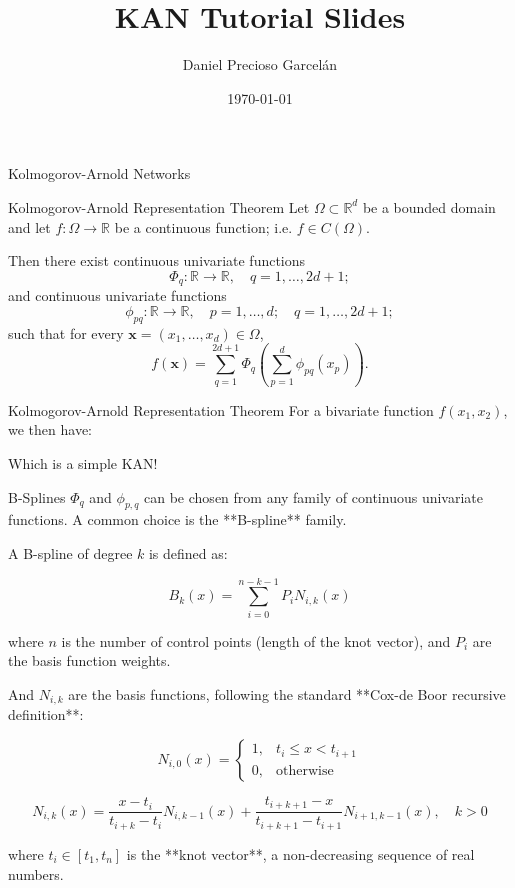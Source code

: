 \documentclass[aspectratio=169]{beamer}
\title{KAN Tutorial Slides}
\author{Daniel Precioso Garcelán}
\date{\today}
\begin{document}
\maketitle
\begin{frame}{Kolmogorov-Arnold Networks}

\end{frame}

\begin{frame}{Kolmogorov-Arnold Representation Theorem}
Let $ \Omega \subset \mathbb{R}^d $ be a bounded domain and let $ f: \Omega \rightarrow \mathbb{R} $ be a continuous function; i.e. $ f \in C(\Omega) $.

Then there exist continuous univariate functions
$$
\Phi_q: \mathbb{R} \to \mathbb{R}, \quad q = 1, \dots, 2d+1;
$$
and continuous univariate functions
$$
\phi_{pq}: \mathbb{R} \to \mathbb{R}, \quad p = 1, \dots, d; \quad q = 1, \dots, 2d+1;
$$
such that for every $\mathbf{x} = (x_1, \dots, x_d) \in \Omega$,
$$
f(\mathbf{x}) = \sum_{q=1}^{2d+1} \Phi_q \left( \sum_{p=1}^d \phi_{pq}(x_p) \right).
$$
\end{frame}

\begin{frame}{Kolmogorov-Arnold Representation Theorem}
For a bivariate function $f(x_1, x_2)$, we then have:

\begin{figure}
	\centering
	\resizebox{0.4\linewidth}{!}{}
\end{figure}

Which is a simple KAN!
\end{frame}

\begin{frame}{B-Splines}
$\Phi_q$ and $\phi_{p,q}$ can be chosen from any family of continuous univariate functions. A common choice is the **B-spline** family.

A B-spline of degree $k$ is defined as:

$$B_k(x) = \sum_{i=0}^{n-k-1} P_i N_{i,k}(x)$$

where $n$ is the number of control points (length of the knot vector), and $P_i$ are the basis function weights.

And $N_{i,k}$ are the basis functions, following the standard **Cox-de Boor recursive definition**:

$$
N_{i,0}(x) =
\begin{cases}
1, & t_i \le x < t_{i+1} \\
0, & \text{otherwise}
\end{cases}
$$

$$
N_{i,k}(x) =
\frac{x - t_i}{t_{i+k} - t_i} N_{i,k-1}(x)
+
\frac{t_{i+k+1} - x}{t_{i+k+1} - t_{i+1}} N_{i+1,k-1}(x),
\quad k > 0
$$

where ${t_i} \in [t_1, t_n]$ is the **knot vector**, a non-decreasing sequence of real numbers.
\end{frame}
\end{document}
